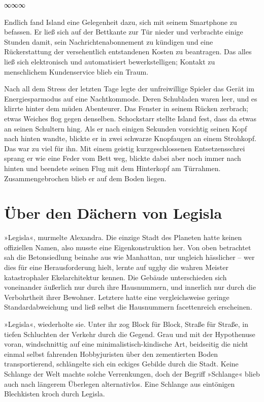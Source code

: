 \begin{center}
∞∞∞
\end{center}

Endlich fand Island eine Gelegenheit dazu, sich mit seinem Smartphone zu befassen. Er ließ sich auf der Bettkante zur Tür nieder und verbrachte einige Stunden damit, sein Nachrichtenabonnement zu kündigen und eine Rückerstattung der versehentlich entstandenen Kosten zu beantragen. Das alles ließ sich elektronisch und automatisiert bewerkstelligen; Kontakt zu menschlichem Kundenservice blieb ein Traum.

Nach all dem Stress der letzten Tage legte der unfreiwillige Spieler das Gerät im Energiesparmodus auf eine Nachtkommode. Deren Schubladen waren leer, und es klirrte hinter dem müden Abenteurer. Das Fenster in seinem Rücken zerbrach; etwas Weiches flog gegen denselben. Schockstarr stellte Island fest, dass da etwas an seinen Schultern hing. Als er nach einigen Sekunden vorsichtig seinen Kopf nach hinten wandte, blickte er in zwei schwarze Knopfaugen an einem Strohkopf. Das war zu viel für ihn. Mit einem geistig kurzgeschlossenen Entsetzensschrei sprang er wie eine Feder vom Bett weg, blickte dabei aber noch immer nach hinten und beendete seinen Flug mit dem Hinterkopf am Türrahmen. Zusammengebrochen blieb er auf dem Boden liegen.


\chapter{Über den Dächern von Legisla}

»Legisla«, murmelte Alexandra. Die einzige Stadt des Planeten hatte keinen offiziellen Namen, also musste eine Eigenkonstruktion her. Von oben betrachtet sah die Betonsiedlung beinahe aus wie Manhattan, nur ungleich hässlicher – wer dies für eine Herausforderung hielt, lernte auf ugghy die wahren Meister katastrophaler Ekelarchitektur kennen. Die Gebäude unterschieden sich voneinander äußerlich nur durch ihre Hausnummern, und innerlich nur durch die Verbohrtheit ihrer Bewohner. Letztere hatte eine vergleichsweise geringe Standardabweichung und ließ selbst die Hausnummern facettenreich erscheinen.

»Legisla«, wiederholte sie. Unter ihr zog Block für Block, Straße für Straße, in tiefen Schluchten der Verkehr durch die Gegend. Grau und mit der Hypothenuse voran, windschnittig auf eine minimalistisch-kindische Art, beidseitig die nicht einmal selbst fahrenden Hobbyjuristen über den zementierten Boden transportierend, schlängelte sich ein eckiges Gebilde durch die Stadt. Keine Schlange der Welt machte solche Verrenkungen, doch der Begriff »Schlange« blieb auch nach längerem Überlegen alternativlos. Eine Schlange aus eintönigen Blechkisten kroch durch Legisla.

